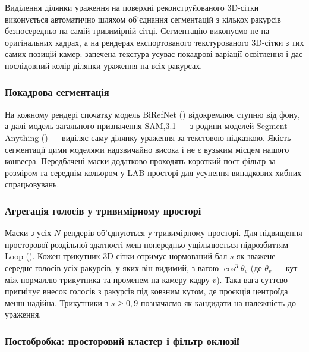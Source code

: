 \documentclass[
  ukrainian,
  10pt,
  a4paper,
  twocolumn]{article}
\begin{document}
Виділення ділянки ураження на поверхні реконструйованого 3D-сітки
виконується автоматично шляхом об'єднання сегментацій з кількох ракурсів
безпосередньо на самій тривимірній сітці. Сегментацію виконуємо не на
оригінальних кадрах, а на рендерах експортованого текстурованого
3D-сітки з тих самих позицій камер: запечена текстура усуває покадрові
варіації освітлення і дає послідовний колір ділянки ураження на всіх
ракурсах.

\subsubsection{Покадрова
сегментація}\label{ux43fux43eux43aux430ux434ux440ux43eux432ux430-ux441ux435ux433ux43cux435ux43dux442ux430ux446ux456ux44f}

На кожному рендері спочатку модель BiRefNet
() відокремлює ступню
від фону, а далі модель загального призначення SAM,3.1 --- з родини
моделей Segment Anything () --- виділяє саму ділянку ураження за текстовою підказкою. Якість
сегментації цими моделями надзвичайно висока і не є вузьким місцем
нашого конвеєра. Передбачені маски додатково проходять короткий
пост-фільтр за розміром та середнім кольором у LAB-просторі для усунення
випадкових хибних спрацьовувань.

\subsubsection{Агрегація голосів у тривимірному
просторі}\label{ux430ux433ux440ux435ux433ux430ux446ux456ux44f-ux433ux43eux43bux43eux441ux456ux432-ux443-ux442ux440ux438ux432ux438ux43cux456ux440ux43dux43eux43cux443-ux43fux440ux43eux441ux442ux43eux440ux456}

Маски з усіх \(N\) рендерів об'єднуються у тривимірному просторі. Для
підвищення просторової роздільної здатності меш попередньо ущільнюється
підрозбиттям Loop (). Кожен
трикутник 3D-сітки отримує нормований бал \(s\) як зважене середнє
голосів усіх ракурсів, у яких він видимий, з вагою \(\cos^3\theta_v\)
(де \(\theta_v\) --- кут між нормаллю трикутника та променем на камеру
кадру \(v\)). Така вага суттєво пригнічує внесок голосів з ракурсів під
ковзним кутом, де проєкція центроїда менш надійна. Трикутники з
\(s \ge 0,9\) позначаємо як кандидати на належність до ураження.

\subsubsection{Постобробка: просторовий кластер і фільтр
оклюзії}\label{ux43fux43eux441ux442ux43eux431ux440ux43eux431ux43aux430-ux43fux440ux43eux441ux442ux43eux440ux43eux432ux438ux439-ux43aux43bux430ux441ux442ux435ux440-ux456-ux444ux456ux43bux44cux442ux440-ux43eux43aux43bux44eux437ux456ux457}
\end{document}
